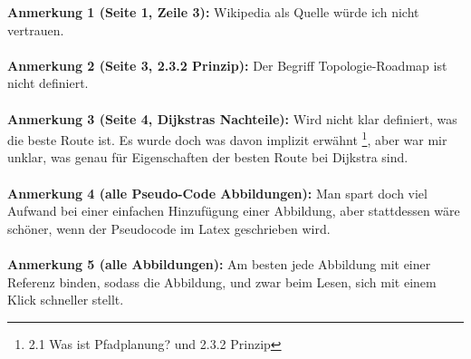 \documentclass[a4paper,12pt]{book}
\begin{document}
\textbf{Anmerkung 1 (Seite 1, Zeile 3):}
Wikipedia als Quelle würde ich nicht vertrauen.
\\
\\
\textbf{Anmerkung 2 (Seite 3, 2.3.2 Prinzip): }
Der Begriff Topologie-Roadmap ist nicht definiert.
 \\
\\
\textbf{Anmerkung 3 (Seite 4, Dijkstras Nachteile):}
Wird nicht klar definiert, was die beste Route ist.
\newline
Es wurde doch was davon implizit erwähnt \footnote{ 2.1  Was ist Pfadplanung? und 2.3.2 Prinzip}, aber war mir unklar, was genau für Eigenschaften der besten Route bei Dijkstra sind.
 \\
\\
\textbf{Anmerkung 4 (alle Pseudo-Code Abbildungen):}
Man spart doch viel Aufwand bei einer einfachen Hinzufügung einer Abbildung, aber stattdessen wäre schöner, wenn der Pseudocode im Latex geschrieben wird. 
\\
\\
\textbf{Anmerkung 5 (alle Abbildungen):}
Am besten jede Abbildung mit einer Referenz binden, sodass die Abbildung, und zwar beim Lesen, sich mit einem Klick schneller stellt.
\end{document}

